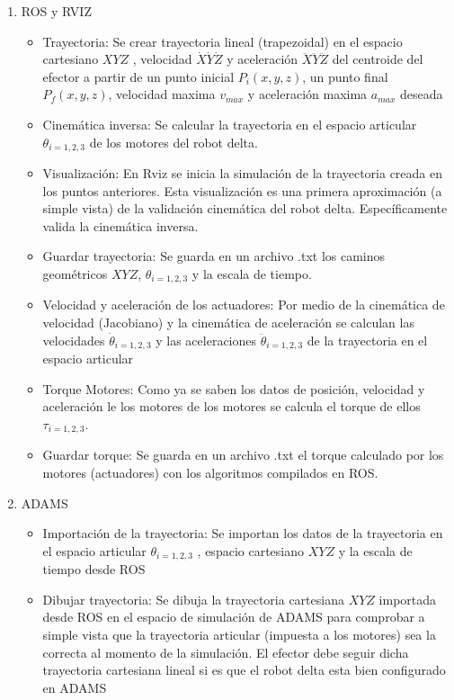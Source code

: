     \begin{enumerate}
        \item ROS y RVIZ
            \begin{itemize}
                \item {Trayectoria: Se crear trayectoria lineal (trapezoidal) en el espacio cartesiano $XYZ$ , velocidad $\dot{X}\dot{Y}\dot{Z}$ y aceleración $\ddot{X}\ddot{Y}\ddot{Z}$ del centroide del efector a partir de un punto inicial $P_i(x,y,z)$, un punto final $P_f(x,y,z)$, velocidad maxima $v_{max}$ y aceleración maxima $a_{max}$ deseada}
                \item {Cinemática inversa: Se calcular la trayectoria en el espacio articular $\theta_{i=1,2,3}$ de los motores del robot delta.}
                \item {Visualización: En Rviz se inicia la simulación de la trayectoria creada en los puntos anteriores. Esta visualización es una primera aproximación (a simple vista) de la validación cinemática del robot delta. Específicamente valida la cinemática inversa.}
                \item {Guardar trayectoria: Se guarda en un archivo .txt los caminos geométricos  $XYZ$, $\theta_{i=1,2,3}$ y la escala de tiempo.
                }
                \item {Velocidad y aceleración de los actuadores: Por medio de la cinemática de velocidad (Jacobiano) y la cinemática de aceleración se calculan las velocidades $\dot{\theta}_{i=1,2,3}$ y las aceleraciones $\ddot{\theta}_{i=1,2,3}$ de la trayectoria en el espacio articular}
                \item{ Torque Motores: Como ya se saben los datos de posición, velocidad y aceleración le los motores de los motores se calcula el torque de ellos $\tau_{i=1,2,3}$.}
                \item {Guardar torque: Se guarda en un archivo .txt el torque calculado por los motores (actuadores) con los algoritmos compilados en ROS.
                }
            \end{itemize}
        \item ADAMS
        \begin{itemize}
            \item {Importación de la trayectoria: Se importan los datos de la trayectoria en el espacio articular $\theta_{i=1,2,3}$ , espacio cartesiano $XYZ$ y la escala de tiempo desde ROS}
            \item {Dibujar trayectoria: Se dibuja la trayectoria cartesiana $XYZ$ importada desde ROS en el espacio de simulación de ADAMS para comprobar a simple vista que la trayectoria articular (impuesta a los motores) sea la correcta al momento de la simulación. El efector debe seguir dicha trayectoria cartesiana lineal si es que el robot delta esta bien configurado en ADAMS}

\end{itemize}
\end{enumerate}
